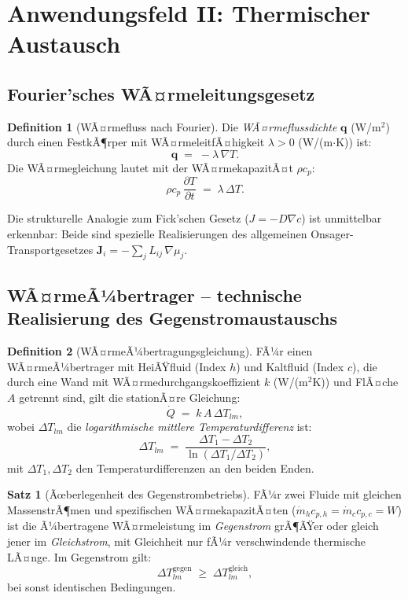 ﻿\documentclass[a4paper,12pt]{article}
\theoremstyle{definition}
\newtheorem{definition}{Definition}
\newtheorem{satz}{Satz}
\begin{document}
\section{Anwendungsfeld II: Thermischer Austausch}

\subsection{Fourier'sches WÃ¤rmeleitungsgesetz}

\begin{definition}[WÃ¤rmefluss nach Fourier]
    Die \emph{WÃ¤rmefluss\-dichte} $\mathbf{q}$ (W/m$^2$) durch einen FestkÃ¶rper
    mit WÃ¤rmeleitfÃ¤higkeit $\lambda > 0$ (W/(m$\cdot$K)) ist:
    \[
        \mathbf{q} \;=\; -\lambda\,\nabla T.
    \]
    Die WÃ¤rmegleichung lautet mit der WÃ¤rmekapazitÃ¤t $\rho c_p$:
    \[
        \rho c_p \,\frac{\partial T}{\partial t} \;=\; \lambda\,\Delta T.
    \]
\end{definition}

Die strukturelle Analogie zum Fick'schen Gesetz ($J = -D\nabla c$) ist unmittelbar
erkennbar: Beide sind spezielle Realisierungen des allgemeinen Onsager-Transportgesetzes
$\mathbf{J}_i = -\sum_j L_{ij}\,\nabla\mu_j$.

\subsection{WÃ¤rmeÃ¼bertrager -- technische Realisierung des Gegenstromaustauschs}

\begin{definition}[WÃ¤rmeÃ¼bertragungsgleichung]
    FÃ¼r einen WÃ¤rmeÃ¼bertrager mit HeiÃŸfluid (Index $h$) und Kaltfluid (Index $c$),
    die durch eine Wand mit WÃ¤rmedurchgangskoeffizient $k$ (W/(m$^2$K)) und
    FlÃ¤che $A$ getrennt sind, gilt die stationÃ¤re Gleichung:
    \[
        \dot{Q} \;=\; k\,A\,\Delta T_{lm},
    \]
    wobei $\Delta T_{lm}$ die \emph{logarithmische mittlere Temperaturdifferenz} ist:
    \[
        \Delta T_{lm} \;=\; \frac{\Delta T_1 - \Delta T_2}{\ln(\Delta T_1/\Delta T_2)},
    \]
    mit $\Delta T_1, \Delta T_2$ den Temperaturdifferenzen an den beiden Enden.
\end{definition}

\begin{satz}[Ãœberlegenheit des Gegenstrombetriebs]
    FÃ¼r zwei Fluide mit gleichen MassenstrÃ¶men und spezifischen WÃ¤rmekapazitÃ¤ten
    ($\dot{m}_h c_{p,h} = \dot{m}_c c_{p,c} = W$) ist die Ã¼bertragene WÃ¤rmeleistung
    im \emph{Gegenstrom} grÃ¶ÃŸer oder gleich jener im \emph{Gleichstrom}, mit
    Gleichheit nur fÃ¼r verschwindende thermische LÃ¤nge.
    Im Gegenstrom gilt:
    \[
        \Delta T_{lm}^{\text{gegen}} \;\geq\; \Delta T_{lm}^{\text{gleich}},
    \]
    bei sonst identischen Bedingungen.
\end{satz}
\end{document}
